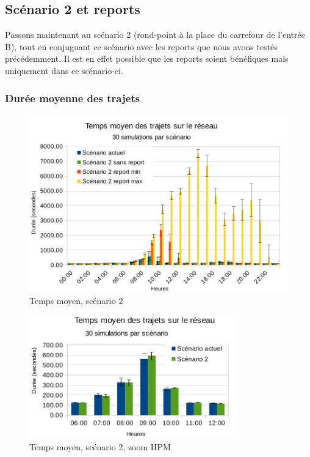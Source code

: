\documentclass[a4paper,11pt, titlepage]{extarticle}
\begin{document}
\newpage

\subsection{Scénario 2 et reports}

Passons maintenant au scénario 2 (rond-point à la place du carrefour de l'entrée B), tout en conjuguant ce scénario avec les reports que nous avons testés précédemment. Il est en effet possible que les reports soient bénéfiques mais uniquement dans ce scénario-ci.

\subsubsection{Durée moyenne des trajets}

\begin{figure}[!h]
  \begin{center}
    \includegraphics[width=13cm]{graphiques/temps_scenario2.png}
  \end{center}
  \vspace{-0.8cm}
  \caption{Temps moyen, scénario 2}
  \label{graphTemps2}
\end{figure}

\begin{figure}
  \begin{center}
    \includegraphics[width=9cm]{graphiques/temps_scenario2_zoom1.png}
  \end{center}
  \caption{Temps moyen, scénario 2, zoom HPM}
  \label{graphTemps2Zoom1}
\end{figure}
\end{document}
